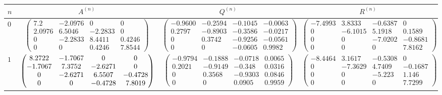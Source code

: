 \documentclass[a4paper,12pt,notitlepage,pdftex,headsepline]{scrartcl}
\begin{document}
\begin{landscape}
\begin{tabular}{|l|c|c|c|}
\hline
$n$ & $A^{\left(n\right)}$ & $Q^{\left(n\right)}$ & $R^{\left(n\right)}$\\
\hline
$0$ & $\left(
\begin{matrix}
7.2 & -2.0976 & 0 & 0\\
2.0976 & 6.5046 & -2.2833 & 0\\
0 & -2.2833  &  8.4411 & 0.4246\\
0 & 0 & 0.4246  & 7.8544
\end{matrix}
\right)$ &
$\left(
\begin{matrix}
-0.9600 &  -0.2594 & -0.1045 & -0.0063\\
0.2797 &  -0.8903 &  -0.3586 &  -0.0217\\
 0 &  0.3742 &  -0.9256 &  -0.0561\\
 0 & 0 &  -0.0605 &   0.9982
\end{matrix}
\right)$ & 
$\left(
\begin{matrix}
 -7.4993 &   3.8333 &  -0.6387  &  0\\
0 & -6.1015 &   5.1918 & 0.1589\\
0 & 0  & -7.0202  & -0.8681\\
0 & 0  & 0 &  7.8162
\end{matrix}
\right)$\\
\hline
$1$ & $\strut\left(
\begin{matrix}
8.2722 &   -1.7067 &   0 &   0\\
-1.7067 &   7.3752 &  -2.6271 & 0\\
0 & -2.6271 &   6.5507 & -0.4728\\
0 &  0 & -0.4728  & 7.8019
\end{matrix}
\right)$
&
$\left(
\begin{matrix}
 -0.9794 &  -0.1888 &  -0.0718 &   0.0065\\
    0.2021 &  -0.9149 &  -0.348 &   0.0316\\
     0 &  0.3568 & -0.9303 &  0.0846\\
   0 &   0  & 0.0905 &  0.9959
\end{matrix}
\right)$
&
$\left(
\begin{matrix}
 -8.4464   & 3.1617 & -0.5308 &  0\\
  0 & -7.3629 &  4.7409 & -0.1687\\
  0 & 0 & -5.223  & 1.146\\
  0 & 0 & 0 &  7.7299
\end{matrix}
\right)$\\

\end{tabular}
\end{landscape}
\end{document}
